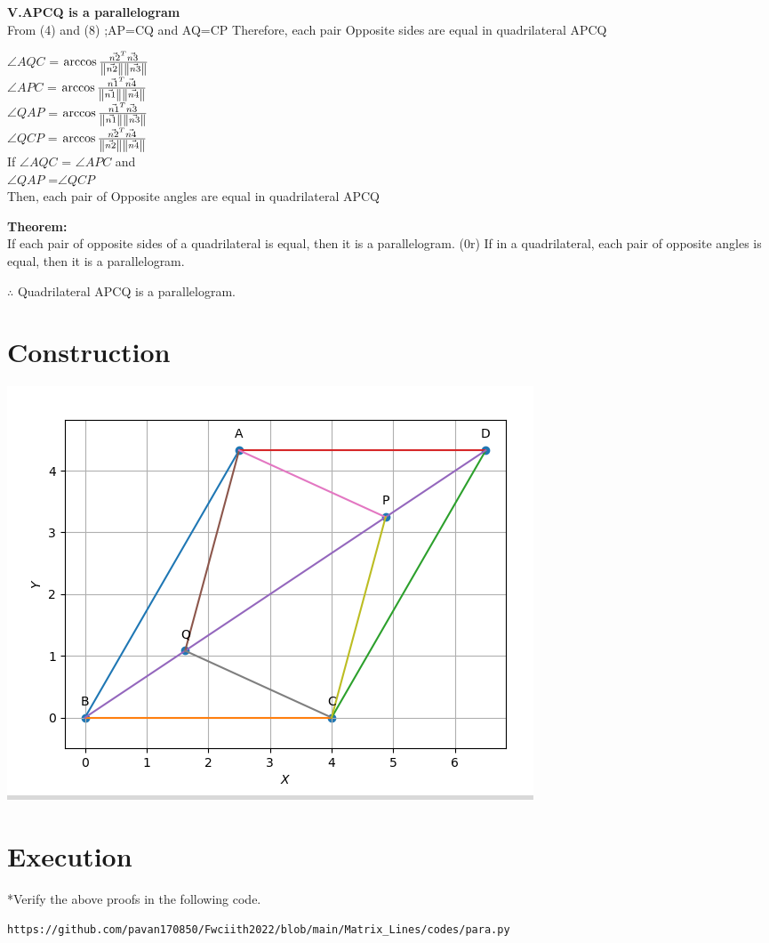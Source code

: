 \documentclass[10pt, a4paper]{article}
\begin{document}
\textbf{V.APCQ is a parallelogram}\\
    From (4) and (8) ;AP=CQ and AQ=CP
    Therefore, each pair  Opposite sides are equal in quadrilateral APCQ

 	  $\angle {AQC}$ = $\arccosine\frac{\vec{n2}^T \vec{n3}}{\norm{\vec{n2}}\norm{\vec{n3}}}$ \\
	  $\angle {APC}$ = $\arccosine\frac{\vec{n1}^T \vec{n4}}{\norm{\vec{n1}}\norm{\vec{n4}}}$ \\

    $\angle {QAP}$ = $\arccosine\frac{\vec{n1}^T \vec{n3}}{\norm{\vec{n1}}\norm{\vec{n3}}}$ \\
	  $\angle {QCP}$ = $\arccosine\frac{\vec{n2}^T \vec{n4}}{\norm{\vec{n2}}\norm{\vec{n4}}}$ \\

    If $\angle {AQC}$ = $\angle {APC}$ and \\ $\angle {QAP}$ =$\angle {QCP}$ \\

    Then, each pair of  Opposite angles are equal in  quadrilateral APCQ

    \textbf{Theorem:}\\If each pair of opposite sides of a quadrilateral is equal, then it is a parallelogram. (0r) 
    If in a quadrilateral, each pair of opposite angles is equal, then it is a parallelogram.
        
    $\therefore$ Quadrilateral APCQ is a parallelogram.\\ 	

\section{Construction}
\includegraphics[scale=0.5]{construction.png} 
    
\section{Execution}
*Verify the above proofs in the following code.\\
\begin{lstlisting}
https://github.com/pavan170850/Fwciith2022/blob/main/Matrix_Lines/codes/para.py
\end{lstlisting}
	


\end{document}

